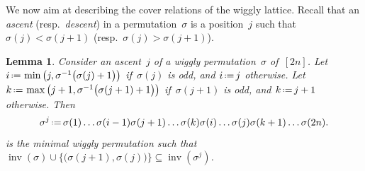 \documentclass{amsart}
\newtheorem{lemma}[theorem]{Lemma}
\theoremstyle{definition}
\newcommand{\eqdef}{\mbox{\,\raisebox{0.2ex}{\scriptsize\ensuremath{\mathrm:}}\ensuremath{=}\,}} %
\DeclareMathOperator{\inv}{inv} %
\newcommand{\darkblue}{\color{darkblue}} %
\newcommand{\defn}[1]{\textsl{\darkblue #1}} %
\begin{document}
We now aim at describing the cover relations of the wiggly lattice.
Recall that an \defn{ascent} (resp.~\defn{descent}) in a permutation~$\sigma$ is a position~$j$ such that~$\sigma(j) < \sigma(j+1)$ (resp.~$\sigma(j) > \sigma(j+1)$).

\begin{lemma}\label{lem:wigglyCoverRelation}
Consider an ascent~$j$ of a wiggly permutation~$\sigma$ of~$[2n]$.
Let~$i \eqdef \min \big( j, \sigma^{-1} \big( \sigma(j)+1 \big) \big)$ if~$\sigma(j)$ is odd, and $i \eqdef j$ otherwise.
Let~$k \eqdef \max \big( j+1, \sigma^{-1} \big( \sigma(j+1)+1 \big) \big)$ if~$\sigma(j+1)$ is odd, and $k \eqdef j+1$ otherwise.
Then
\[
\sigma^j \eqdef \sigma(1) \dots \sigma(i-1) \sigma(j+1) \dots \sigma(k) \sigma(i) \dots \sigma(j) \sigma(k+1) \dots \sigma(2n).
\]
is the minimal wiggly permutation such that~$\inv(\sigma) \cup \big\{ \big( \sigma(j+1), \sigma(j) \big) \big\} \subseteq \inv(\sigma^j)$.
\end{lemma}
\end{document}
